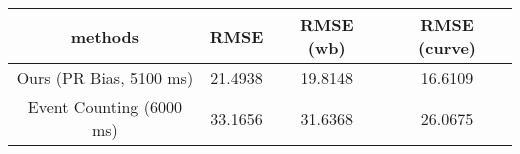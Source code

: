 \begin{table}[t]
    \centering
    \begin{adjustbox}{max width=\columnwidth}
    \setlength{\tabcolsep}{3pt}
    \begin{tabular}{c|c|c|c}
        \toprule
        methods & RMSE & RMSE (wb) & RMSE (curve) \\
        \hline
        Ours (PR Bias, 5100 ms) & 21.4938 & 19.8148 & 16.6109  \\
        Event Counting\cite{RGBD} (6000 ms) & 33.1656 & 31.6368 & 26.0675 \\
    \bottomrule
    \end{tabular}
    \end{adjustbox}
\end{table}

